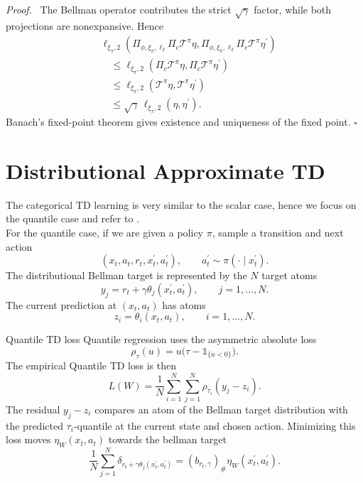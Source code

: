 \documentclass[12pt]{article}
\newcommand*{\QED}{\hfill\ensuremath{\square}}
\newenvironment{proof}{\par\smallskip\noindent\textit{Proof.}\ }{\QED\par\smallskip}
\newcommand{\1}{\mathds{1}}
\newcommand{\T}{\mathcal{T}}
\begin{document}
\begin{proof}
The Bellman operator contributes the strict $\sqrt{\gamma}$ factor, while both
projections are nonexpansive. Hence
$$
\begin{aligned}
  &\ell_{\xi_\pi,2}
  \left(
    \Pi_{\phi,\xi_\pi,\ell_2}\Pi_c\T^\pi\eta,
    \Pi_{\phi,\xi_\pi,\ell_2}\Pi_c\T^\pi\eta^{\prime}
  \right)\\
  &\quad\leq
  \ell_{\xi_\pi,2}(\Pi_c\T^\pi\eta,\Pi_c\T^\pi\eta^{\prime})\\
  &\quad\leq
  \ell_{\xi_\pi,2}(\T^\pi\eta,\T^\pi\eta^{\prime})\\
  &\quad\leq
  \sqrt{\gamma}\,\ell_{\xi_\pi,2}(\eta,\eta^{\prime}).
\end{aligned}
$$
Banach's fixed-point theorem gives existence and uniqueness of the fixed
point.
\end{proof}

\section{Distributional Approximate TD}

The categorical TD learning is very similar to the scalar case, hence we focus on the quantile case and refer to \cite[Chapter 10]{bellemare2023distributional}. \\

For the quantile case, if we are given a policy $\pi$, sample a transition and next action
$$
  (x_t,a_t,r_t,x^{\prime}_t,a^{\prime}_t),
  \qquad a^{\prime}_t\sim\pi(\cdot\mid x^{\prime}_t).
$$
The distributional Bellman target is represented by the $N$ target atoms
$$
  y_j
  =
  r_t+\gamma\theta_j(x^{\prime}_t,a^{\prime}_t),
  \qquad j=1,\ldots,N.
$$
The current prediction at $(x_t,a_t)$ has atoms
$$
  z_i=\theta_i(x_t,a_t),
  \qquad i=1,\ldots,N.
$$
\begin{definition}{Quantile TD loss}{}
Quantile regression uses the asymmetric absolute loss
$$
  \rho_\tau(u)
  =
  u\bigl(\tau-\1_{\{u<0\}}\bigr).
$$
The empirical Quantile TD loss is then
$$
  L(W)
  =
  \frac{1}{N}
  \sum_{i=1}^N
  \sum_{j=1}^N
  \rho_{\tau_i}(y_j-z_i).
$$
The residual $y_j-z_i$ compares an atom of the Bellman target distribution with
the predicted $\tau_i$-quantile at the current state and chosen action. Minimizing this
loss moves $\eta_W(x_t,a_t)$ towards the bellman target
$$
  \frac{1}{N}\sum_{j=1}^N
  \delta_{r_t+\gamma\theta_j(x^{\prime}_t,a^{\prime}_t)}
  =
  (b_{r_t,\gamma})_{\#}\eta_W(x^{\prime}_t,a^{\prime}_t).
$$
\end{definition}
\end{document}
